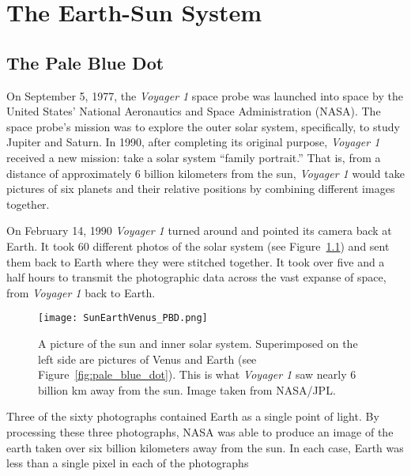 
\chapter{The Earth-Sun System}\label{ch:earth_sun} 

\section{\label{sec:pbd}The Pale Blue Dot}

On September 5, 1977, the \emph{Voyager 1} space probe was launched into space by the United States' National Aeronautics and Space Administration (NASA). The space probe's mission was to explore the outer solar system, specifically, to study Jupiter and Saturn. In 1990, after completing its original purpose,  \emph{Voyager 1} received a new mission: take a solar system ``family portrait.'' That is, from a distance of approximately 6 billion kilometers from the sun, \emph{Voyager 1} would take pictures of six planets and their relative positions by combining different images together.

On February 14, 1990  \emph{Voyager 1} turned around and pointed its camera back at Earth. It took 60 different photos of the solar system (see Figure~\ref{fig:EarthSunVenus}) and sent them back to Earth where they were stitched together. It took over five and a half hours to transmit the photographic data across the vast expanse of space, from \emph{Voyager 1} back to Earth. 

    \begin{figure}[ht]
    \centering
		\texttt{[image: SunEarthVenus\_PBD.png]}
		\caption{A picture of the sun and inner solar system. Superimposed on the left side are pictures of Venus and Earth (see Figure~\ref{fig:pale_blue_dot}). This is what \emph{Voyager 1} saw nearly 6 billion \si{\km} away from the sun. Image taken from NASA/JPL.}
        \label{fig:EarthSunVenus}
    \end{figure}

Three of the sixty photographs contained Earth as a single point of light. By processing these three photographs, NASA was able to produce an image of the earth taken over six billion kilometers away from the sun. In each case, Earth was less than a single pixel in each of the photographs %

